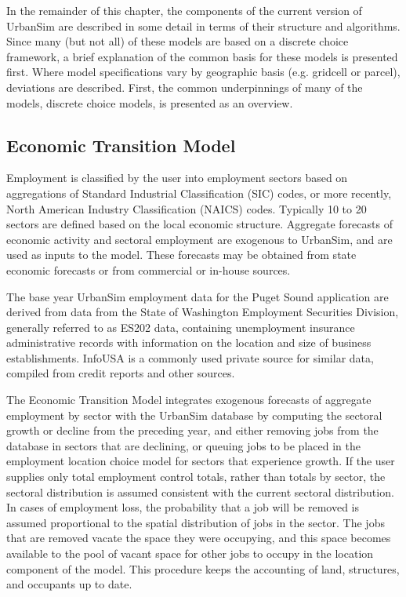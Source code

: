 In the remainder of this chapter, the components of the current version of UrbanSim
are described in some detail in terms of their
structure and algorithms.  Since many (but not all) of these models are based on a discrete choice framework,
a brief explanation of the common basis for these models is presented first.  Where model specifications
vary by geographic basis (e.g. gridcell or parcel), deviations are described.  First, the common underpinnings
of many of the models, discrete choice models, is presented as an overview.


\subsection{Economic Transition Model}
Employment is classified by the user into employment sectors based
on aggregations of Standard Industrial Classification (SIC) codes, or more
recently, North American Industry Classification (NAICS) codes.
Typically 10 to 20 sectors are defined based on the local economic
structure. Aggregate forecasts of economic activity and sectoral
employment are exogenous to UrbanSim, and are used as inputs to
the model. These forecasts may be obtained from state economic
forecasts or from commercial or in-house sources.

The base year UrbanSim employment data for the
Puget Sound application are derived from data from the State of Washington
Employment Securities Division, generally referred to
as ES202 data, containing unemployment insurance administrative
records with information on the location and size of business
establishments.  InfoUSA is a commonly used private source for
similar data, compiled from credit reports and other sources.

The Economic Transition Model integrates exogenous forecasts
of aggregate employment by sector with the UrbanSim database by
computing the sectoral growth or decline from the preceding year,
and either removing jobs from the database in sectors that are
declining, or queuing jobs to be placed in the employment location
choice model for sectors that experience growth.  If the user
supplies only total employment control totals, rather than totals
by sector, the sectoral distribution is assumed consistent with
the current sectoral distribution. In cases of employment loss,
the probability that a job will be removed is assumed proportional
to the spatial distribution of jobs in the sector.  The jobs that
are removed vacate the space they were occupying, and this space
becomes available to the pool of vacant space for other jobs to
occupy in the location component of the model.  This procedure
keeps the accounting of land, structures, and occupants up to
date.


